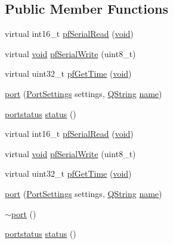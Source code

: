 \subsection*{Public Member Functions}
\begin{DoxyCompactItemize}
\item 
virtual int16\-\_\-t \hyperlink{classport_gadd5058c032731db789a6939d946b8488}{pf\-Serial\-Read} (\hyperlink{group___u_a_v_objects_plugin_ga444cf2ff3f0ecbe028adce838d373f5c}{void})
\item 
virtual \hyperlink{group___u_a_v_objects_plugin_ga444cf2ff3f0ecbe028adce838d373f5c}{void} \hyperlink{classport_gacf5dd3d2c9621fe585631102008d1230}{pf\-Serial\-Write} (uint8\-\_\-t)
\item 
virtual uint32\-\_\-t \hyperlink{classport_ga32f898399d197f0ffd28f7a09677bc9b}{pf\-Get\-Time} (\hyperlink{group___u_a_v_objects_plugin_ga444cf2ff3f0ecbe028adce838d373f5c}{void})
\item 
\hyperlink{classport_ga07c31ea30e7226e74f05a64bf51e89c8}{port} (\hyperlink{struct_port_settings}{Port\-Settings} settings, \hyperlink{group___u_a_v_objects_plugin_gab9d252f49c333c94a72f97ce3105a32d}{Q\-String} \hyperlink{glext_8h_ad977737dfc9a274a62741b9500c49a32}{name})
\item 
\hyperlink{classport_a2f8ecb3d9778a986988296b474912ad3}{portstatus} \hyperlink{classport_gad6f230ba369433c2d5c0aefe3b337853}{status} ()
\item 
virtual int16\-\_\-t \hyperlink{group___uploader_gadd5058c032731db789a6939d946b8488}{pf\-Serial\-Read} (\hyperlink{group___u_a_v_objects_plugin_ga444cf2ff3f0ecbe028adce838d373f5c}{void})
\item 
virtual \hyperlink{group___u_a_v_objects_plugin_ga444cf2ff3f0ecbe028adce838d373f5c}{void} \hyperlink{group___uploader_gacf5dd3d2c9621fe585631102008d1230}{pf\-Serial\-Write} (uint8\-\_\-t)
\item 
virtual uint32\-\_\-t \hyperlink{group___uploader_ga32f898399d197f0ffd28f7a09677bc9b}{pf\-Get\-Time} (\hyperlink{group___u_a_v_objects_plugin_ga444cf2ff3f0ecbe028adce838d373f5c}{void})
\item 
\hyperlink{group___uploader_ga07c31ea30e7226e74f05a64bf51e89c8}{port} (\hyperlink{struct_port_settings}{Port\-Settings} settings, \hyperlink{group___u_a_v_objects_plugin_gab9d252f49c333c94a72f97ce3105a32d}{Q\-String} \hyperlink{glext_8h_ad977737dfc9a274a62741b9500c49a32}{name})
\item 
\hyperlink{group___uploader_gacd903c84068e3b7829d0688ae4aad58e}{$\sim$port} ()
\item 
\hyperlink{classport_a2f8ecb3d9778a986988296b474912ad3}{portstatus} \hyperlink{group___uploader_gad6f230ba369433c2d5c0aefe3b337853}{status} ()
\end{DoxyCompactItemize}

